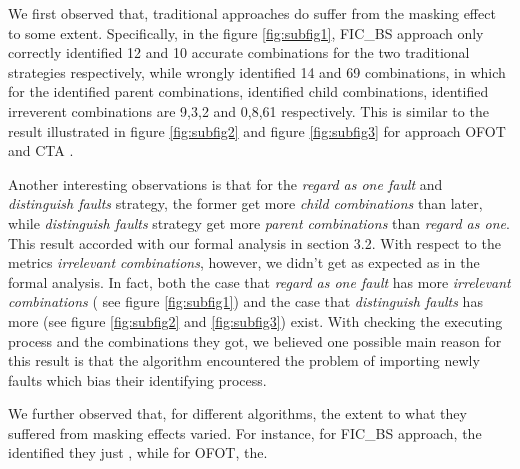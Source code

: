 \documentclass{sig-alternate}
\begin{document}
We first observed that, traditional approaches do suffer from the masking effect to some extent. Specifically, in the figure \ref{fig:subfig1}, FIC\_BS approach only correctly identified 12 and 10 accurate combinations for the two traditional strategies respectively, while wrongly identified 14 and 69 combinations, in which for the identified parent combinations, identified child combinations, identified irreverent combinations are 9,3,2 and 0,8,61 respectively. This is similar to the result illustrated in figure \ref{fig:subfig2} and figure \ref{fig:subfig3} for approach OFOT and CTA .

Another interesting observations is that for the \emph{regard as one fault} and \emph{distinguish faults} strategy, the former get more \emph{child combinations} than later, while \emph{distinguish faults} strategy get more \emph{parent combinations} than \emph{regard as one}. This result accorded with our formal analysis in section 3.2. With respect to the metrics \emph{irrelevant combinations}, however, we didn't get as expected as in the formal analysis. In fact, both the case that \emph{regard as one fault} has more \emph{irrelevant combinations} ( see figure \ref{fig:subfig1}) and the case that \emph{distinguish faults} has more (see figure \ref{fig:subfig2} and \ref{fig:subfig3}) exist. With checking the executing process and the combinations they got, we believed one possible main reason for this result is that the algorithm encountered the problem of importing newly faults which bias their identifying process.


We further observed that, for different algorithms, the extent to what they suffered from masking effects varied. For instance, for FIC\_BS approach, the identified they just , while  for OFOT, the.

%
\end{document}
